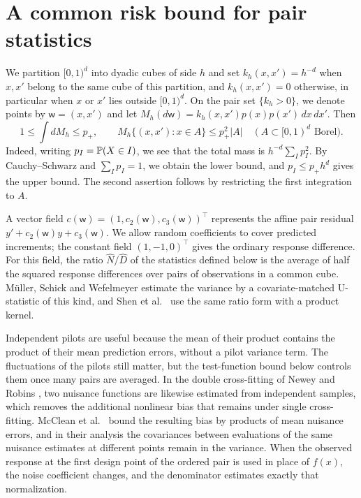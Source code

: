 \section{A common risk bound for pair statistics}\label{sec:pair-risk}

We partition $[0,1)^d$ into dyadic cubes of side $h$ and set
$k_h(x,x')=h^{-d}$ when $x,x'$ belong to the same cube of this
partition, and $k_h(x,x')=0$ otherwise, in particular when $x$ or $x'$
lies outside $[0,1)^d$. On the pair set
$\{k_h>0\}$, we denote points by $\mathsf w=(x,x')$ and let
$M_h(d\mathsf w)=k_h(x,x')p(x)p(x')\,dx\,dx'$. Then
\begin{equation}\label{eq:U7-mass}
 1\le\int dM_h\le p_+,\qquad
 M_h\{(x,x'):x\in A\}\le p_+^2|A|
 \quad(A\subset[0,1)^d\text{ Borel}).
\end{equation}
Indeed, writing $p_I=\mathbb P(X\in I)$, we see that the total mass is
$h^{-d}\sum_Ip_I^2$. By Cauchy--Schwarz and $\sum_Ip_I=1$, we obtain
the lower bound, and $p_I\le p_+h^d$ gives the upper bound.
The second assertion follows by restricting the first integration
to $A$.

A vector field $c(\mathsf w)=(1,c_2(\mathsf w),c_3(\mathsf w))^\top$
represents the affine pair residual $y'+c_2(\mathsf w)y+c_3(\mathsf w)$.
We allow random coefficients to cover predicted increments; the constant
field $(1,-1,0)^\top$ gives the ordinary response difference. For this
field, the ratio $\widehat N/\widehat D$ of the statistics defined below
is the average of half the squared response differences over pairs of
observations in a common cube. M\"uller, Schick and Wefelmeyer
\cite{MullerEtAl2003} estimate the variance by a covariate-matched
U-statistic of this kind, and Shen et al.\
\cite[Section~4.1, equation~(19)]{ShenGaoWittenHan2020} use the same
ratio form with a product kernel.

Independent pilots are useful because the mean of their product
contains the product of their mean prediction errors, without a pilot
variance term. The fluctuations of the pilots still matter, but the test-function
bound below controls them once many pairs are averaged. In the double
cross-fitting of Newey and Robins \cite[Section~2]{NeweyRobins2018},
two nuisance functions are likewise estimated from independent samples,
which removes the additional nonlinear bias that remains under single
cross-fitting. McClean et al.\
\cite[Section~3, Lemma~1]{McCleanEtAl2024} bound the resulting bias by
products of mean nuisance errors, and in their analysis the covariances
between evaluations of the same nuisance estimates at different points
remain in the variance. When the
observed response at the first design point of the ordered pair is used
in place of $f(x)$, the noise
coefficient changes, and the denominator estimates exactly that
normalization.

